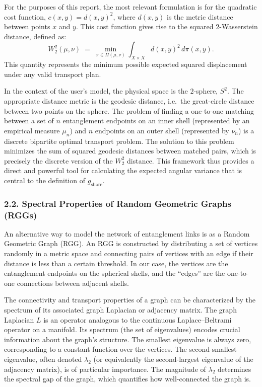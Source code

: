 \documentclass[11pt]{article}
\begin{document}
For the purposes of this report, the most relevant formulation is for the quadratic cost function, $c(x,y) = d(x,y)^2$, where $d(x,y)$ is the metric distance between points $x$ and $y$. This cost function gives rise to the squared $2$-Wasserstein distance, defined as:
\[
W_2^2(\mu, \nu) \;=\; \min_{\pi \in \Pi(\mu, \nu)} \int_{X \times X} d(x,y)^2 \, d\pi(x,y).
\]
This quantity represents the minimum possible expected squared displacement under any valid transport plan.

In the context of the user’s model, the physical space is the $2$-sphere, $S^2$. The appropriate distance metric is the geodesic distance, i.e.\ the great-circle distance between two points on the sphere. The problem of finding a one-to-one matching between a set of $n$ entanglement endpoints on an inner shell (represented by an empirical measure $\mu_n$) and $n$ endpoints on an outer shell (represented by $\nu_n$) is a discrete bipartite optimal transport problem. The solution to this problem minimizes the sum of squared geodesic distances between matched pairs, which is precisely the discrete version of the $W_2^2$ distance. This framework thus provides a direct and powerful tool for calculating the expected angular variance that is central to the definition of $g_{\mathrm{share}}$.

\subsubsection*{2.2. Spectral Properties of Random Geometric Graphs (RGGs)}
An alternative way to model the network of entanglement links is as a Random Geometric Graph (RGG). An RGG is constructed by distributing a set of vertices randomly in a metric space and connecting pairs of vertices with an edge if their distance is less than a certain threshold. In our case, the vertices are the entanglement endpoints on the spherical shells, and the “edges” are the one-to-one connections between adjacent shells.

The connectivity and transport properties of a graph can be characterized by the spectrum of its associated graph Laplacian or adjacency matrix. The graph Laplacian $L$ is an operator analogous to the continuous Laplace–Beltrami operator on a manifold. Its spectrum (the set of eigenvalues) encodes crucial information about the graph’s structure. The smallest eigenvalue is always zero, corresponding to a constant function over the vertices. The second-smallest eigenvalue, often denoted $\lambda_2$ (or equivalently the second-largest eigenvalue of the adjacency matrix), is of particular importance. The magnitude of $\lambda_2$ determines the spectral gap of the graph, which quantifies how well-connected the graph is.
\end{document}
